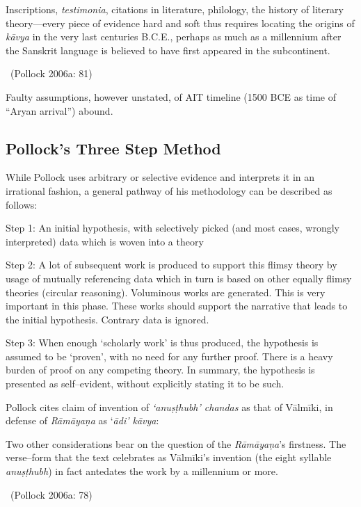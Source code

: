 \begin{myquote}
Inscriptions, \textit{testimonia}, citations in literature, philology, the history of literary theory—every piece of evidence hard and soft thus requires locating the origins of \textit{kāvya} in the very last centuries B.C.E., perhaps as much as a millennium after the Sanskrit language is believed to have ﬁrst appeared in the subcontinent. 

~\hfill (Pollock 2006a: 81)
\end{myquote}

Faulty assumptions, however unstated, of AIT timeline (1500 BCE as time of “Aryan arrival”) abound.


\subsection*{Pollock’s Three Step Method}

While Pollock uses arbitrary or selective evidence and interprets it in an irrational fashion, a general pathway of his methodology can be described as follows:

Step 1: An initial hypothesis, with selectively picked (and most cases, wrongly interpreted) data which is woven into a theory

Step 2: A lot of subsequent work is produced to support this flimsy theory by usage of mutually referencing data which in turn is based on other equally flimsy theories (circular reasoning). Voluminous works are generated. This is very important in this phase. These works should support the narrative that leads to the initial hypothesis. Contrary data is ignored.

Step 3: When enough ‘scholarly work’ is thus produced, the hypothesis is assumed to be ‘proven’, with no need for any further proof. There is a heavy burden of proof on any competing theory. In summary, the hypothesis is presented as self–evident, without explicitly stating it to be such.

Pollock cites claim of invention of \textit{‘anuṣṭhubh’ chandas} as that of Vālmīki, in defense of \textit{Rāmāyaṇa} as ‘\textit{ādi’ kāvya}:

\begin{myquote}
Two other considerations bear on the question of the \textit{Rāmāyaṇa}’s ﬁrstness. The verse–form that the text celebrates as Vālmīki’s invention (the eight syllable \textit{anuṣṭhubh}) in fact antedates the work by a millennium or more. 

~\hfill (Pollock 2006a: 78)
\end{myquote}

